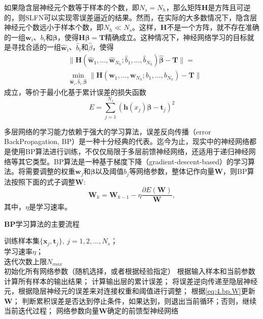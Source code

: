 如果隐含层神经元个数等于样本的个数，即$N_{s}=N_{h}$，那么矩阵$\bm{H}$是方阵且可逆的，则SLFN可以实现零误差逼近的结果。然而，在实际的大多数情况下，隐含层神经元个数远小于样本个数，即$N_{h}\ll N_{s}$。这样，$\bm{H}$不是一个方阵，就不存在准确的一组$\bm{w}_{i}$、$b_{i}$和$\bm{\beta}$，使得$\bm{H}\bm{\beta}=\bm{T}$精确成立。这种情况下，神经网络学习的目标就是寻找合适的一组$\hat{\bm{w}}_{i}$、$\hat{b}_{i}$和$\hat{\beta}$，使得
\begin{equation}\label{eq:4.nn.H-T}
\begin{split}%
&\|\bm{H}(\hat{\bm{w}}_{1},\dots,\hat{\bm{w}}_{N_{h}};\hat{b}_{1},\dots,\hat{b}_{N_{h}})\hat{\bm{\beta}}-\bm{T}\|=\\
&\min_{\hat{\bm{w}}_{i},\hat{b}_{i},\hat{\bm{\beta}}}\|\bm{H}(\bm{w}_{1},\dots,\bm{w}_{N_{h}};b_{1},\dots,b_{N_{h}})-\bm{T}\|
\end{split}
\end{equation}
成立，等价于最小化基于累计误差的损失函数
\begin{equation}\label{eq:4.nn.cost}
E=\sum_{j=1}^{N_{s}}(\bm{h}(x_{j})\bm{\beta}-\bm{t}_{j})^{2}
\end{equation}

多层网络的学习能力依赖于强大的学习算法，误差反向传播（error BackPropagation, BP）是一种十分经典的代表。迄今为止，现实中的神经网络都是使用BP算法进行训练，不仅仅局限于多层前馈神经网络，还适用于递归神经网络等其它类型。BP算法是一种基于梯度下降（gradient-descent-based）的学习算法。将需要调整的权重$\bm{w}_{j}$和$\bm{\beta}$以及阈值$b_{j}$等网络参数，整体记作向量$\bm{W}$，则BP算法按照下面的式子调整$\bm{W}$:
\begin{equation}\label{eq:4.bp.W}
\bm{W}_{k} = \bm{W}_{k-1}-\eta\frac{\partial E(\bm{W})}{\bm{W}},
\end{equation}
其中，$\eta$是学习速率。

\begin{algo}[htp]
\caption{$\mathbf{BP}$学习算法的主要流程}
\label{alg.bp}
\begin{algorithmic}%
\REQUIRE 训练样本集$\{\bm{x}_{j},\bm{t}_{j}\},\ j=1,2,\ldots,N_{s}$；\\
学习速率$\eta$；\\
迭代次数上限$N_{max}$\\
\STATE 初始化所有网络参数（随机选择，或者根据经验指定）
  \STATE 根据输入样本和当前参数计算所有样本的输出结果；
  \STATE 计算输出层的累计误差；
  \STATE 将误差逆向传递至隐层神经元，根据隐层神经元的误差来对连接权重和阈值进行调整；
  \STATE 根据\eqref{eq:4.bp.W}更新$\bm{W}$；
  \STATE 判断累积误差是否达到停止条件，如果达到，则退出当前循环；否则，继续当前迭代过程；
\ENDFOR
\ENSURE 网络参数向量$\bm{W}$确定的前馈型神经网络\\
\end{algorithmic}
\end{algo}

